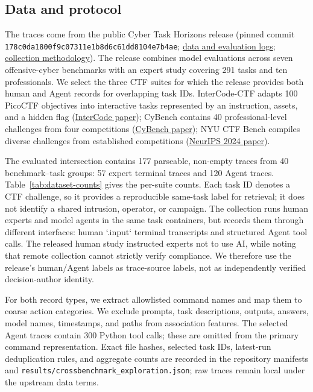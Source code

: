 \subsection{Data and protocol}
\label{sec:data-protocol}

The traces come from the public Cyber Task Horizons release (pinned commit \texttt{178c0da1800f9c07311e1b8d6c61dd8104e7b4ae}; \href{https://github.com/lyptus-research/cyber-task-horizons-data/tree/178c0da1800f9c07311e1b8d6c61dd8104e7b4ae}{data and evaluation logs}; \href{https://lyptusresearch.org/research/offensive-cyber-time-horizons}{collection methodology}). The release combines model evaluations across seven offensive-cyber benchmarks with an expert study covering 291 tasks and ten professionals. We select the three CTF suites for which the release provides both human and Agent records for overlapping task IDs. InterCode-CTF adapts 100 PicoCTF objectives into interactive tasks represented by an instruction, assets, and a hidden flag (\href{https://papers.nips.cc/paper_files/paper/2023/file/4b175d846fb008d540d233c188379ff9-Paper-Datasets_and_Benchmarks.pdf}{InterCode paper}); CyBench contains 40 professional-level challenges from four competitions (\href{https://arxiv.org/abs/2408.08926}{CyBench paper}); NYU CTF Bench compiles diverse challenges from established competitions (\href{https://proceedings.neurips.cc/paper_files/paper/2024/hash/69d97a6493fbf016fff0a751f253ad18-Abstract-Datasets_and_Benchmarks_Track.html}{NeurIPS 2024 paper}).

The evaluated intersection contains 177 parseable, non-empty traces from 40 benchmark--task groups: 57 expert terminal traces and 120 Agent traces. Table~\ref{tab:dataset-counts} gives the per-suite counts. Each task ID denotes a CTF challenge, so it provides a reproducible same-task label for retrieval; it does not identify a shared intrusion, operator, or campaign. The collection runs human experts and model agents in the same task containers, but records them through different interfaces: human `.input` terminal transcripts and structured Agent tool calls. The released human study instructed experts not to use AI, while noting that remote collection cannot strictly verify compliance. We therefore use the release's human/Agent labels as trace-source labels, not as independently verified decision-author identity.

For both record types, we extract allowlisted command names and map them to coarse action categories. We exclude prompts, task descriptions, outputs, answers, model names, timestamps, and paths from association features. The selected Agent traces contain 300 Python tool calls; these are omitted from the primary command representation. Exact file hashes, selected task IDs, latest-run deduplication rules, and aggregate counts are recorded in the repository manifests and \texttt{results/crossbenchmark\_exploration.json}; raw traces remain local under the upstream data terms.

